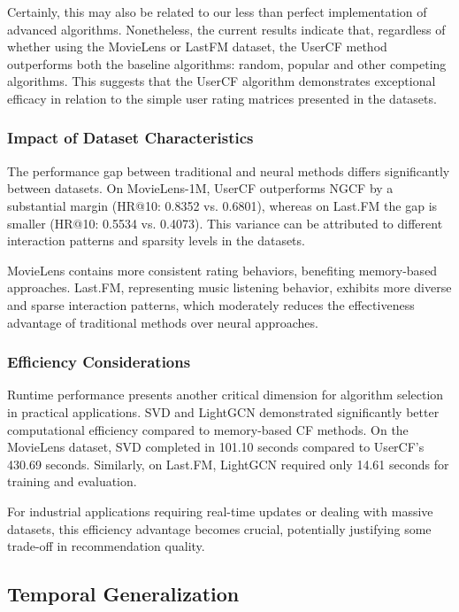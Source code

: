 \documentclass[sigconf,nonacm]{acmart} %
\begin{document}
Certainly, this may also be related to our less than perfect implementation of advanced algorithms. Nonetheless, the current results indicate that, regardless of whether using the MovieLens or LastFM dataset, the UserCF method outperforms both the baseline algorithms: random, popular and other competing algorithms. This suggests that the UserCF algorithm demonstrates exceptional efficacy in relation to the simple user rating matrices presented in the datasets.

\subsubsection{Impact of Dataset Characteristics}  

The performance gap between traditional and neural methods differs significantly between datasets. On MovieLens-1M, UserCF outperforms NGCF by a substantial margin (HR@10: 0.8352 vs. 0.6801), whereas on Last.FM the gap is smaller (HR@10: 0.5534 vs. 0.4073). This variance can be attributed to different interaction patterns and sparsity levels in the datasets.  

MovieLens contains more consistent rating behaviors, benefiting memory-based approaches. Last.FM, representing music listening behavior, exhibits more diverse and sparse interaction patterns, which moderately reduces the effectiveness advantage of traditional methods over neural approaches.  

\subsubsection{Efficiency Considerations}  

Runtime performance presents another critical dimension for algorithm selection in practical applications. SVD and LightGCN demonstrated significantly better computational efficiency compared to memory-based CF methods. On the MovieLens dataset, SVD completed in 101.10 seconds compared to UserCF's 430.69 seconds. Similarly, on Last.FM, LightGCN required only 14.61 seconds for training and evaluation.  

For industrial applications requiring real-time updates or dealing with massive datasets, this efficiency advantage becomes crucial, potentially justifying some trade-off in recommendation quality.  

\subsection{Temporal Generalization}  
\end{document}
